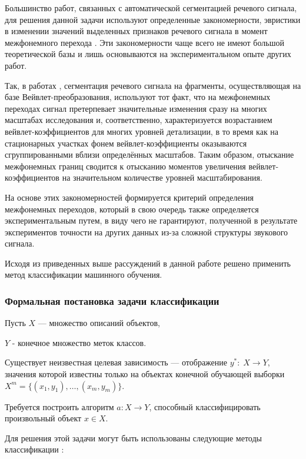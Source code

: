 \documentclass[utf8x, 14pt, oneside, a4paper]{article}
\begin{document}
	Большинство работ, связанных с автоматической сегментацией речевого сигнала, для решения данной задачи используют определенные закономерности, эвристики в изменении значений выделенных признаков речевого сигнала в момент межфонемного перехода \cite{disertation}. Эти закономерности чаще всего не имеют большой теоретической базы и лишь основываются на экспериментальном опыте других работ.
	
	Так, в работах \cite{vevlet_1}, \cite{vevlet_2} сегментация речевого сигнала на фрагменты, осуществляющая на базе Вейвлет-преобразования, используют тот факт, что на межфонемных переходах сигнал претерпевает значительные изменения сразу на многих масштабах исследования и, соответственно, характеризуется возрастанием вейвлет-коэффициентов для многих уровней детализации, в то время как на стационарных участках фонем вейвлет-коэффициенты оказываются сгруппированными вблизи определённых масштабов. Таким образом, отыскание межфонемных границ сводится к отысканию моментов увеличения вейвлет-коэффициентов на значительном количестве уровней масштабирования.
	
	На основе этих закономерностей формируется критерий определения межфонемных переходов, который в свою очередь также определяется экспериментальным путем, в виду чего не гарантируют, полученной в результате экспериментов точности на других данных из-за сложной структуры звукового сигнала.
	
	Исходя из приведенных выше рассуждений в данной работе решено применить метод классификации машинного обучения.
	
	\subsubsection{Формальная постановка задачи классификации}\label{formal_classification}
	
	Пусть $X$ — множество описаний объектов,
	
	$Y$ - конечное множество меток классов. 
	
	Существует неизвестная целевая зависимость — отображение $y^{*}:\; X\to Y$, значения которой известны только на объектах конечной обучающей выборки $X^m = \{(x_1,y_1),\dots,(x_m,y_m)\}$. 
	
	Требуется построить алгоритм $a: X\to Y$, способный классифицировать произвольный объект $x \in X$.
	
	Для решения этой задачи могут быть использованы следующие методы классификации \cite{classification_methods}:
	
\end{document}
